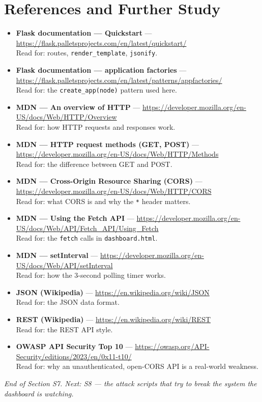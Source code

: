 \documentclass[11pt,a4paper]{article}
\begin{document}
\section{References and Further Study}
\begin{itemize}
  \item \textbf{Flask documentation --- Quickstart} ---
        \url{https://flask.palletsprojects.com/en/latest/quickstart/}\\
        Read for: routes, \texttt{render\_template}, \texttt{jsonify}.
  \item \textbf{Flask documentation --- application factories} ---
        \url{https://flask.palletsprojects.com/en/latest/patterns/appfactories/}\\
        Read for: the \texttt{create\_app(node)} pattern used here.
  \item \textbf{MDN --- An overview of HTTP} ---
        \url{https://developer.mozilla.org/en-US/docs/Web/HTTP/Overview}\\
        Read for: how HTTP requests and responses work.
  \item \textbf{MDN --- HTTP request methods (GET, POST)} ---
        \url{https://developer.mozilla.org/en-US/docs/Web/HTTP/Methods}\\
        Read for: the difference between GET and POST.
  \item \textbf{MDN --- Cross-Origin Resource Sharing (CORS)} ---
        \url{https://developer.mozilla.org/en-US/docs/Web/HTTP/CORS}\\
        Read for: what CORS is and why the \texttt{*} header matters.
  \item \textbf{MDN --- Using the Fetch API} ---
        \url{https://developer.mozilla.org/en-US/docs/Web/API/Fetch_API/Using_Fetch}\\
        Read for: the \texttt{fetch} calls in \texttt{dashboard.html}.
  \item \textbf{MDN --- setInterval} ---
        \url{https://developer.mozilla.org/en-US/docs/Web/API/setInterval}\\
        Read for: how the 3-second polling timer works.
  \item \textbf{JSON (Wikipedia)} ---
        \url{https://en.wikipedia.org/wiki/JSON}\\
        Read for: the JSON data format.
  \item \textbf{REST (Wikipedia)} ---
        \url{https://en.wikipedia.org/wiki/REST}\\
        Read for: the REST API style.
  \item \textbf{OWASP API Security Top 10} ---
        \url{https://owasp.org/API-Security/editions/2023/en/0x11-t10/}\\
        Read for: why an unauthenticated, open-CORS API is a real-world weakness.
\end{itemize}

\vfill
\begin{center}\footnotesize\itshape
End of Section S7. Next: S8 --- the attack scripts that try to break the system
the dashboard is watching.
\end{center}
\end{document}
